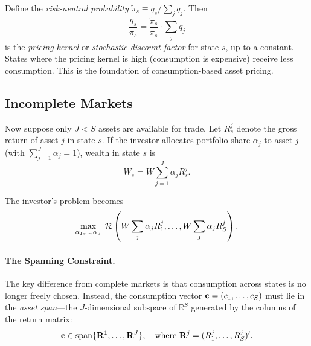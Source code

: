 \begin{calloutnote}
Define the \emph{risk-neutral probability} $\tilde{\pi}_s \equiv q_s / \sum_j q_j$. Then
\[
\frac{q_s}{\pi_s} = \frac{\tilde{\pi}_s}{\pi_s} \cdot \sum_j q_j
\]
is the \emph{pricing kernel} or \emph{stochastic discount factor} for state $s$, up to a constant. States where the pricing kernel is high (consumption is expensive) receive less consumption. This is the foundation of consumption-based asset pricing.
\end{calloutnote}

\subsection{Incomplete Markets}
\label{subsec:incomplete-markets}

Now suppose only $J < S$ assets are available for trade. Let $R_s^j$ denote the gross return of asset $j$ in state $s$. If the investor allocates portfolio share $\alpha_j$ to asset $j$ (with $\sum_{j=1}^{J} \alpha_j = 1$), wealth in state $s$ is
\begin{equation}
W_s = W \sum_{j=1}^{J} \alpha_j R_s^j.
\label{eq:portfolio-wealth}
\end{equation}

The investor's problem becomes
\begin{equation}
\max_{\alpha_1, \ldots, \alpha_J} \; \mathcal{R}\left( W \sum_{j} \alpha_j R_1^j, \ldots, W \sum_{j} \alpha_j R_S^j \right).
\label{eq:incomplete-markets-problem}
\end{equation}

\paragraph{The Spanning Constraint.}

The key difference from complete markets is that consumption across states is no longer freely chosen. Instead, the consumption vector $\mathbf{c} = (c_1, \ldots, c_S)$ must lie in the \emph{asset span}---the $J$-dimensional subspace of $\mathbb{R}^S$ generated by the columns of the return matrix:
\begin{equation}
\mathbf{c} \in \text{span}\{ \mathbf{R}^1, \ldots, \mathbf{R}^J \}, \quad \text{where } \mathbf{R}^j = (R_1^j, \ldots, R_S^j)'.
\label{eq:asset-span}
\end{equation}

